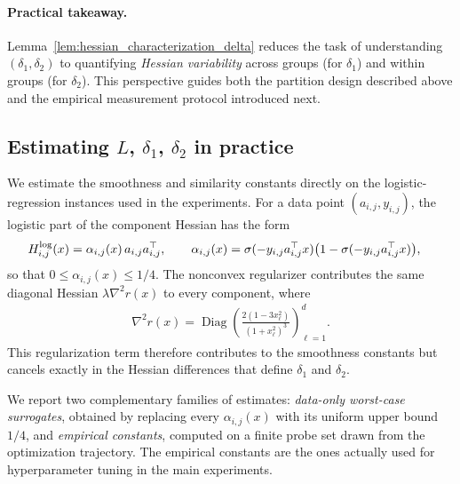 \documentclass{article}
\DeclareMathOperator{\Diag}{Diag}       %
\newcommand{\rb}[1]{\left(#1\right)}
\theoremstyle{plain}
\begin{document}
\paragraph{Practical takeaway.}
Lemma~\ref{lem:hessian_characterization_delta} reduces the task of understanding $(\delta_1,\delta_2)$ to quantifying \emph{Hessian variability} across groups (for $\delta_1$) and within groups (for $\delta_2$). This perspective guides both the partition design described above and the empirical measurement protocol introduced next.


\subsection{Estimating $L$, $\delta_1$, $\delta_2$ in practice}
\label{sec:exp_estimating_deltas}

We estimate the smoothness and similarity constants directly on the logistic-regression instances used in the experiments. For a data point $(a_{i,j},y_{i,j})$, the logistic part of the component Hessian has the form
\begin{align}
    H^{\rm log}_{i,j}(x)
    &=
    \alpha_{i,j}(x)\,a_{i,j}a_{i,j}^{\top},
    \qquad
    \alpha_{i,j}(x)
    =
    \sigma(-y_{i,j}a_{i,j}^{\top}x)
    \bigl(1-\sigma(-y_{i,j}a_{i,j}^{\top}x)\bigr),
\end{align}
so that $0\leq \alpha_{i,j}(x)\leq 1/4$. The nonconvex regularizer contributes the same diagonal Hessian $\lambda\nabla^2 r(x)$ to every component, where
\begin{align}
    \nabla^2 r(x)
    =
    \Diag\!\rb{
        \frac{2(1-3x_\ell^2)}{(1+x_\ell^2)^3}
    }_{\ell=1}^d .
\end{align}
This regularization term therefore contributes to the smoothness constants but cancels exactly in the Hessian differences that define $\delta_1$ and $\delta_2$.

We report two complementary families of estimates: \emph{data-only worst-case surrogates}, obtained by replacing every $\alpha_{i,j}(x)$ with its uniform upper bound $1/4$, and \emph{empirical constants}, computed on a finite probe set drawn from the optimization trajectory. The empirical constants are the ones actually used for hyperparameter tuning in the main experiments.
\end{document}

